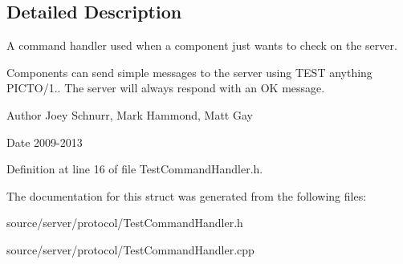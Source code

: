 \subsection{Detailed Description}
A command handler used when a component just wants to check on the server. 

Components can send simple messages to the server using T\-E\-S\-T anything P\-I\-C\-T\-O/1.. The server will always respond with an O\-K message. \begin{DoxyAuthor}{Author}
Joey Schnurr, Mark Hammond, Matt Gay 
\end{DoxyAuthor}
\begin{DoxyDate}{Date}
2009-\/2013 
\end{DoxyDate}


Definition at line 16 of file Test\-Command\-Handler.\-h.



The documentation for this struct was generated from the following files\-:\begin{DoxyCompactItemize}
\item 
source/server/protocol/Test\-Command\-Handler.\-h\item 
source/server/protocol/Test\-Command\-Handler.\-cpp\end{DoxyCompactItemize}
